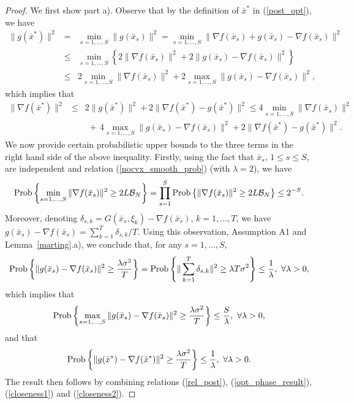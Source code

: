 \documentclass[final]{siamltex}
\newcommand{\beq}{\begin{equation}}
\newcommand{\eeq}{\end{equation}}
\newcommand{\beqa}{\begin{eqnarray}}
\newcommand{\eeqa}{\end{eqnarray}}
\newcommand{\beqas}{\begin{eqnarray*}}
\newcommand{\eeqas}{\end{eqnarray*}}
\newcommand{\nn}{\nonumber}
\def\eqnok#1{(\ref{#1})}
\def\prob{{\rm Prob}}
\def\prob{\mathop{\rm Prob}}
\def\cB{{\cal B}}
\begin{document}
\begin{proof}
We first show part a).
Observe that by the definition of $\bar x^*$ in \eqnok{post_opt}, we have
\beqas
\|g(\bar x^*)\|^2 &=& \min_{s=1,\ldots,S} \|g(\bar x_s)\|^2
= \min_{s=1,\ldots,S} \|\nabla f(\bar x_s) + g(\bar x_s) - \nabla f(\bar x_s)\|^2 \\
&\le& \min_{s=1, \ldots,S} \left\{2 \|\nabla f(\bar x_s)\|^2 + 2
\|g(\bar x_s) - \nabla f(\bar x_s) \|^2 \right\} \\
&\le& 2 \min_{s=1, \ldots,S} \|\nabla f(\bar x_s)\|^2 +
2 \max_{s=1,\ldots,S} \|g(\bar x_s) - \nabla f(\bar x_s) \|^2,
\eeqas
which implies that
\beqa
\|\nabla f(\bar x^*)\|^2 &\le& 2 \|g(\bar x^*)\|^2 + 2 \|\nabla f(\bar x^*) - g(\bar x^*)\|^2
\le 4
\min_{s=1, \ldots,S} \|\nabla f(\bar x_s)\|^2  \nn \\
&& \,\, + \,
4 \max_{s=1,\ldots,S} \|g(\bar x_s) - \nabla f(\bar x_s) \|^2 +
 2 \|\nabla f(\bar x^*) - g(\bar x^*)\|^2 . \label{rel_post}
\eeqa
We now provide certain probabilistic upper bounds to the three terms in the
right hand side of the above inequality. Firstly, using the fact
that $\bar x_s$, $1\le s \le S$, are independent and
relation \eqnok{nocvx_smooth_prob} (with $\lambda = 2$), we have
\beq \label{opt_phase_result}
\prob \left\{
\min_{s= 1, \ldots, S} \|\nabla f(\bar x_s)\|^2 \ge
2 L \cB_N \right\} = \prod_{s=1}^S \prob\left\{\|\nabla f(\bar x_s)\|^2 \ge
2 L \cB_N \right\} \le 2^{-S}.
\eeq
Moreover, denoting $\delta_{s,k} = G(\bar x_s, \xi_k) - \nabla f(\bar x_s)$, $k = 1, \ldots, T$,
we have $g(\bar x_s) - \nabla f(\bar x_s) = \sum_{k=1}^T \delta_{s,k} / T$. Using this observation,
Assumption A1 and Lemma~\ref{marting}.a), we conclude that, for any $s = 1, \ldots, S$,
\[
\prob\left\{ \|g(\bar x_s) - \nabla f(\bar x_s)\|^2 \ge  \frac{\lambda \sigma^2}{T} \right\}
= \prob\left\{ \|\sum_{k=1}^T \delta_{s,k} \|^2 \ge  \lambda T \sigma^2 \right\}
\le \frac{1}{\lambda}, \ \forall \lambda > 0,
\]
which implies that
\beq \label{closeness1}
\prob\left\{
\max_{s=1,\ldots,S} \|g(\bar x_s) - \nabla f(\bar x_s)\|^2 \ge \frac{\lambda \sigma^2}{T}
 \right\} \le \frac{S}{\lambda},  \ \forall \lambda > 0,
\eeq
and that
\beq \label{closeness2}
\prob\left\{
\|g(\bar x^*) - \nabla f(\bar x^*)\|^2  \ge  \frac{\lambda \sigma^2}{T}
\right\} \le \frac{1}{\lambda}, \ \forall \lambda > 0.
\eeq
The result then follows by combining relations \eqnok{rel_post}, \eqnok{opt_phase_result},
\eqnok{closeness1} and \eqnok{closeness2}.


\end{proof}
\end{document}
